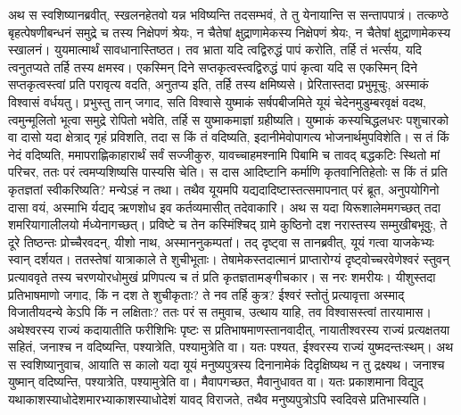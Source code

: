 \adhyAya
{}
\vakya अथ स स्वशिष्यानब्रवीत्, स्खलनहेतवो यन्न भविष्यन्ति तदसम्भवं, ते तु येनायान्ति स सन्तापपात्रं।
\vakya तत्कण्ठे बृहत्पेषणीबन्धनं समुद्रे च तस्य निक्षेपणं श्रेयः, न चैतेषां क्षुद्राणामेकस्य निक्षेपणं श्रेयः, न चैतेषां क्षुद्राणामेकस्य स्खालनं।
\vakya युयमात्मार्थं सावधानास्तिष्ठत। तव भ्राता यदि त्वद्विरुद्धं पापं करोति, तर्हि तं भर्त्सय, यदि त्वनुतप्यते तर्हि तस्य क्षमस्व।
\vakya एकस्मिन् दिने सप्तकृत्वस्त्वद्विरुद्धं पापं कृत्वा यदि स एकस्मिन् दिने सप्तकृत्वस्त्वां प्रति परावृत्य वदति, अनुतप्य इति, तर्हि तस्य क्षमिष्यसे।
\vakya प्रेरितास्तदा प्रभुमूचुः, अस्माकं विश्वासं वर्धयतु।
\vakya प्रभुस्तु तान् जगाद, सति विश्वासे युष्माकं सर्षपबीजमिते यूयं चेदेनमुडुम्बरवृक्षं वदथ, त्वमुन्मूलितो भूत्वा समुद्रे रोपितो भवेति, तर्हि स युष्माकमाज्ञां ग्रहीष्यति।
\vakya युष्माकं कस्यचिद्धलधरः पशुचारको वा दासो यदा क्षेत्राद् गृहं प्रविशति, तदा स किं तं वदिष्यति, इदानीमेवोपागत्य भोजनार्थमुपविशेति।
\vakya स तं किं नेदं वदिष्यति, ममापराह्णिकाहारार्थं सर्वं सज्जीकुरु, यावच्चाहमश्नामि पिबामि च तावद् बद्धकटिः स्थितो मां परिचर, ततः परं त्वमप्यशिष्यसि पास्यसि चेति।
\vakya स दास आदिष्टानि कर्माणि कृतवानितिहेतोः स किं तं प्रति कृतज्ञतां स्वीकरिष्यति?
\vakya मन्येऽहं न तथा। तथैव यूयमपि यद्यदादिष्टास्तत्समापनात् परं ब्रूत, अनुपयोगिनो दासा वयं, अस्माभि र्यद्यद् ऋणशोध इव कर्तव्यमासीत् तदेवाकारि।
\vakya अथ स यदा यिरूशालेममगच्छत् तदा शमरियागालीलयो र्मध्येनागच्छत्।
\vakya प्रविष्टे च तेन कस्मिंश्चिद् ग्रामे कुष्ठिनो दश नरास्तस्य सम्मुखीबभूवुः,
\vakya ते दूरे तिष्ठन्तः प्रोच्चैरवदन्, यीशो नाथ, अस्माननुकम्पतां।
\vakya तद् दृष्ट्वा स तानब्रवीत्, यूयं गत्वा याजकेभ्यः स्वान् दर्शयत।
\vakya ततस्तेषां यात्राकाले ते शुचीभूताः। तेषामेकस्तदात्मानं प्राप्तारोग्यं दृष्ट्वोच्चरवेणेश्वरं स्तुवन् प्रत्याववृते
\vakya तस्य चरणयोरधोमुखं प्रणिपत्य च तं प्रति कृतज्ञतामङ्गीचकार। स नरः शमरीयः।
\vakya यीशुस्तदा प्रतिभाषमाणो जगाद, किं न दश ते शुचीकृताः? ते नव तर्हि कुत्र?
\vakya ईश्वरं स्तोतुं प्रत्यावृत्ता अस्माद् विजातीयदन्ये केऽपि किं न लक्षिताः?
\vakya ततः परं स तमुवाच, उत्थाय याहि, तव विश्वासस्त्वां तारयामास।
\vakya अथेश्वरस्य राज्यं कदायातीति फरीशिभिः पृष्टः स प्रतिभाषमाणस्तानवादीत्, नायातीश्वरस्य राज्यं प्रत्यक्षतया सहितं, जनाश्च न वदिष्यन्ति, पश्यात्रेति, पश्यामुत्रेति वा।
\vakya यतः पश्यत, ईश्वरस्य राज्यं युष्मदन्तःस्थम्।
\vakya अथ स स्वशिष्यानुवाच, आयाति स कालो यदा यूयं मनुष्यपुत्रस्य दिनानामेकं दिदृक्षिष्यथ न तु द्रक्ष्यथ।
\vakya जनाश्च युष्मान् वदिष्यन्ति, पश्यात्रेति, पश्यामुत्रेति वा। मैवापगच्छत, मैवानुधावत वा।
\vakya यतः प्रकाशमाना विद्युद् यथाकाशस्याधोदेशमारभ्याकाशस्याधोदेशं यावद् विराजते, तथैव मनुष्यपुत्रोऽपि स्वदिवसे प्रतिभास्यति।
